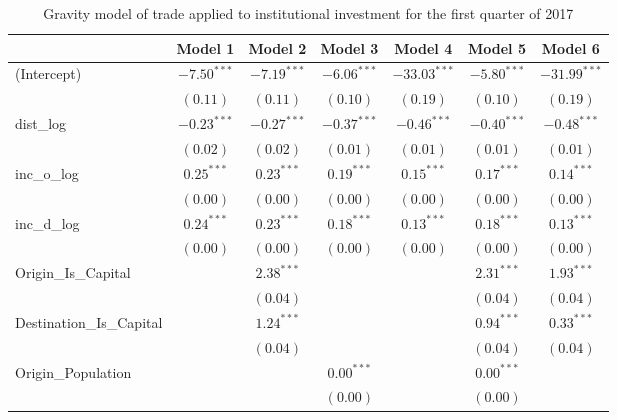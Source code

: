 \begin{table}
	\begin{center}
		\small
		\caption[Gravity Model of Trade for Q1 2017]{Gravity model of trade applied to institutional investment for the first quarter of 2017}
		\begin{tabular}{l c c c c c c }
			\hline
			& Model 1 & Model 2 & Model 3 & Model 4 & Model 5 & Model 6 \\
			\hline
			(Intercept)                  & $-7.50^{***}$ & $-7.19^{***}$ & $-6.06^{***}$ & $-33.03^{***}$ & $-5.80^{***}$ & $-31.99^{***}$ \\
			& $(0.11)$      & $(0.11)$      & $(0.10)$      & $(0.19)$       & $(0.10)$      & $(0.19)$       \\
			dist\_log                    & $-0.23^{***}$ & $-0.27^{***}$ & $-0.37^{***}$ & $-0.46^{***}$  & $-0.40^{***}$ & $-0.48^{***}$  \\
			& $(0.02)$      & $(0.02)$      & $(0.01)$      & $(0.01)$       & $(0.01)$      & $(0.01)$       \\
			inc\_o\_log                  & $0.25^{***}$  & $0.23^{***}$  & $0.19^{***}$  & $0.15^{***}$   & $0.17^{***}$  & $0.14^{***}$   \\
			& $(0.00)$      & $(0.00)$      & $(0.00)$      & $(0.00)$       & $(0.00)$      & $(0.00)$       \\
			inc\_d\_log                  & $0.24^{***}$  & $0.23^{***}$  & $0.18^{***}$  & $0.13^{***}$   & $0.18^{***}$  & $0.13^{***}$   \\
			& $(0.00)$      & $(0.00)$      & $(0.00)$      & $(0.00)$       & $(0.00)$      & $(0.00)$       \\
			Origin\_Is\_Capital          &               & $2.38^{***}$  &               &                & $2.31^{***}$  & $1.93^{***}$   \\
			&               & $(0.04)$      &               &                & $(0.04)$      & $(0.04)$       \\
			Destination\_Is\_Capital     &               & $1.24^{***}$  &               &                & $0.94^{***}$  & $0.33^{***}$   \\
			&               & $(0.04)$      &               &                & $(0.04)$      & $(0.04)$       \\
			Origin\_Population           &               &               & $0.00^{***}$  &                & $0.00^{***}$  &                \\
			&               &               & $(0.00)$      &                & $(0.00)$      &                \\

\end{tabular}
\end{center}
\end{table}
